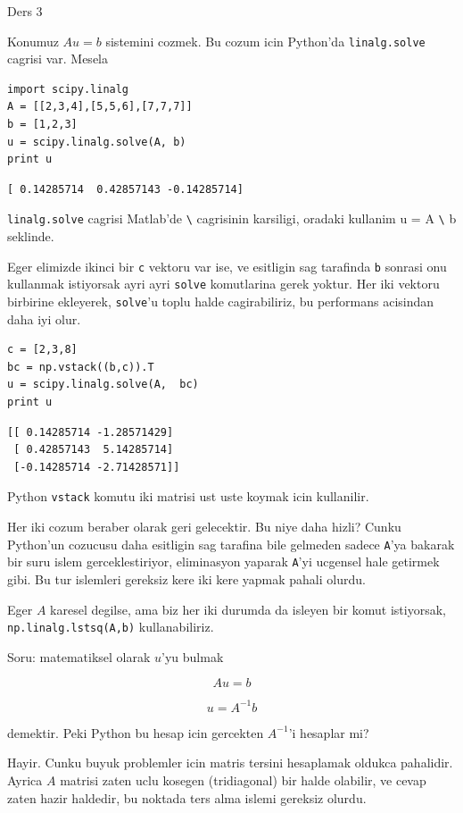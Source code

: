 \documentclass[12pt,fleqn]{article}\usepackage{../common}
\begin{document}
Ders 3

Konumuz $Au = b$ sistemini cozmek. Bu cozum icin Python'da
\verb!linalg.solve! cagrisi var. Mesela

\begin{verbatim}
import scipy.linalg
A = [[2,3,4],[5,5,6],[7,7,7]]
b = [1,2,3]
u = scipy.linalg.solve(A, b)
print u
\end{verbatim}

\begin{verbatim}
[ 0.14285714  0.42857143 -0.14285714]
\end{verbatim}

\verb!linalg.solve! cagrisi Matlab'de \verb!\! cagrisinin karsiligi,
oradaki kullanim u = A \verb!\! b seklinde. 

Eger elimizde ikinci bir \verb!c! vektoru var ise, ve esitligin sag
tarafinda \verb!b! sonrasi onu kullanmak istiyorsak ayri ayri \verb!solve!
komutlarina gerek yoktur. Her iki vektoru birbirine ekleyerek,
\verb!solve!'u toplu halde cagirabiliriz, bu performans acisindan daha iyi
olur. 

\begin{verbatim}
c = [2,3,8]
bc = np.vstack((b,c)).T
u = scipy.linalg.solve(A,  bc)
print u
\end{verbatim}

\begin{verbatim}
[[ 0.14285714 -1.28571429]
 [ 0.42857143  5.14285714]
 [-0.14285714 -2.71428571]]
\end{verbatim}

Python \verb!vstack! komutu iki matrisi ust uste koymak icin kullanilir.

Her iki cozum beraber olarak geri gelecektir. Bu niye daha hizli? Cunku
Python'un cozucusu daha esitligin sag tarafina bile gelmeden sadece
\verb!A!'ya bakarak bir suru islem gerceklestiriyor, eliminasyon yaparak
\verb!A!'yi ucgensel hale getirmek gibi. Bu tur islemleri gereksiz kere iki
kere yapmak pahali olurdu.

Eger $A$ karesel degilse, ama biz her iki durumda da isleyen bir komut
istiyorsak, \verb!np.linalg.lstsq(A,b)! kullanabiliriz. 

Soru: matematiksel olarak $u$'yu bulmak 

\[ Au = b \]

\[ u = A^{-1}b \]

demektir. Peki Python bu hesap icin gercekten $A^{-1}$'i hesaplar mi?

Hayir. Cunku buyuk problemler icin matris tersini hesaplamak oldukca
pahalidir. Ayrica $A$ matrisi zaten uclu kosegen (tridiagonal) bir halde
olabilir, ve cevap zaten hazir haldedir, bu noktada ters alma islemi
gereksiz olurdu. 
\end{document}
